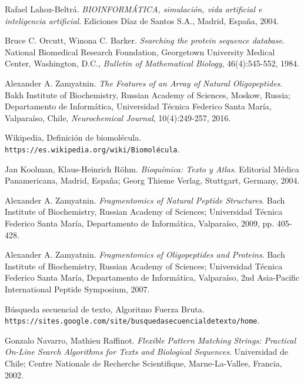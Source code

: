 \documentclass[letterpaper, 10pt, notitlepage]{report}
\begin{document}
\begin{thebibliography}{9}

Rafael Lahoz-Beltrá.
\textit{BIOINFORMÁTICA, simulación, vida artificial e inteligencia artificial}. 
Ediciones Díaz de Santos S.A., Madrid, España, 2004.

Bruce C. Orcutt, Winona C. Barker.
\textit{Searching the protein sequence database}.
National Biomedical Research Foundation, Georgetown University Medical Center,
Washington, D.C., \textit{Bulletin of Mathematical Biology}, 46(4):545-552, 1984.

Alexander A. Zamyatnin.
\textit{The Features of an Array of Natural Oligopeptides}.
Bakh Institute of Biochemistry, Russian Academy of Sciences, Moskow, Russia;
Departamento de Informática, Universidad Técnica Federico Santa María, Valparaíso, Chile,
\textit{Neurochemical Journal}, 10(4):249-257, 2016.

Wikipedia, Definición de biomolécula.
\\\texttt{https://es.wikipedia.org/wiki/Biomolécula}.

Jan Koolman, Klaus-Heinrich Röhm.
\textit{Bioquímica: Texto y Atlas}.
Editorial Médica Panamericana, Madrid, España;
Georg Thieme Verlag, Stuttgart, Germany, 2004.

Alexander A. Zamyatnin.
\textit{Fragmentomics of Natural Peptide Structures}. 
Bach Institute of Biochemistry, Russian Academy of Sciences;  Universidad Técnica Federico Santa María, Departamento de Informática, Valparaíso, 2009, pp. 405-428.

Alexander A. Zamyatnin. 
\textit{Fragmentomics of Oligopeptides and Proteins}. 
Bach Institute of Biochemistry, Russian Academy of Sciences;  Universidad Técnica Federico Santa María, Departamento de Informática, Valparaíso, 2nd Asia-Pacific International Peptide Symposium, 2007.

Búsqueda secuencial de texto, Algoritmo Fuerza Bruta.
\\\texttt{https://sites.google.com/site/busquedasecuencialdetexto/home}.

Gonzalo Navarro, Mathieu Raffinot.
\textit{Flexible Pattern Matching Strings: Practical On-Line Search Algorithms for Texts and Biological Sequences}.
Universidad de Chile; Centre Nationale de Recherche Scientifique, Marne-La-Vallee, Francia, 2002.


\end{thebibliography}
\end{document}

